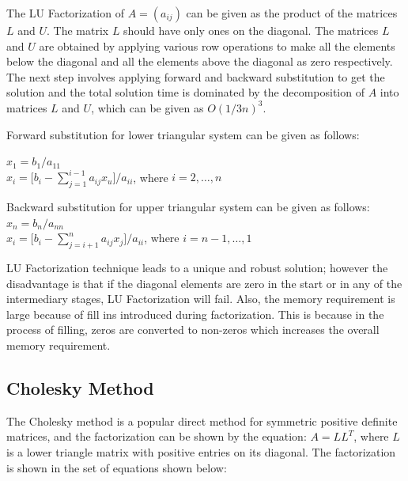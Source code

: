 The LU Factorization of $A = (a_{ij})$ can be given as the product of the matrices $L$ and $U$. The matrix $L$ should have only ones on the diagonal. The matrices $L$ and $U$ are obtained by applying various row operations to make all the elements below the diagonal and all the elements above the diagonal as zero respectively. The next step involves applying forward and backward substitution to get the solution and the total solution time is dominated by the decomposition of $A$ into matrices $L$ and $U$, which can be given as $O(1/3n)^3$.

Forward substitution for lower triangular system can be given as follows: \\
\begin{center}
$x_{1} = b_{1}/a_{11}$ \\
$x_{i} = \lbrack b_{i} - \sum_{j=1}^{i-1} a_{ij} x_{u} \rbrack / a_{ii}$, where $i = 2, \ldots, n$

Backward substitution for upper triangular system can be given as follows:
\\
$x_{n} = b_{n}/a_{nn}$ \\
$x_{i} = \lbrack b_{i} - \sum_{j=i+1}^{n} a_{ij} x_{j} \rbrack / a_{ii}$, where $i = n-1, \ldots, 1$
\end{center}

LU Factorization technique leads to a unique and robust solution; however the disadvantage is that if the diagonal elements are zero in the start or in any of the intermediary stages, LU Factorization will fail. Also, the memory requirement is large because of fill ins introduced during factorization. This is because in the process of filling, zeros are converted to non-zeros which increases the overall memory requirement. 

\subsection{Cholesky Method}
The Cholesky method is a popular direct method for symmetric positive definite matrices, and the factorization can be shown by the equation:
$A = LL^{T}$, where $L$ is a lower triangle matrix with positive entries on its diagonal. The factorization is shown in the set of equations shown below:

